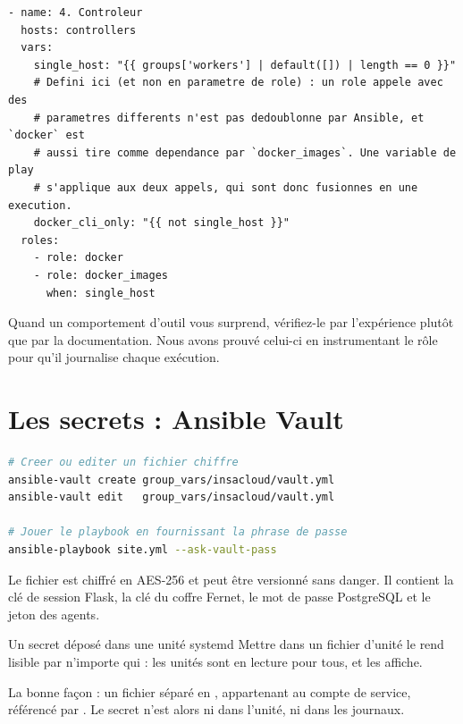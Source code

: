 \begin{lstlisting}[language=yamlplus,caption={La correction : une variable de play, pas un paramètre de rôle}]
- name: 4. Controleur
  hosts: controllers
  vars:
    single_host: "{{ groups['workers'] | default([]) | length == 0 }}"
    # Defini ici (et non en parametre de role) : un role appele avec des
    # parametres differents n'est pas dedoublonne par Ansible, et `docker` est
    # aussi tire comme dependance par `docker_images`. Une variable de play
    # s'applique aux deux appels, qui sont donc fusionnes en une execution.
    docker_cli_only: "{{ not single_host }}"
  roles:
    - role: docker
    - role: docker_images
      when: single_host
\end{lstlisting}

\begin{retenir}
Quand un comportement d'outil vous surprend, vérifiez-le par l'expérience
plutôt que par la documentation. Nous avons prouvé celui-ci en instrumentant
le rôle pour qu'il journalise chaque exécution.
\end{retenir}

\section{Les secrets : Ansible Vault}

\begin{lstlisting}[language=bash]
# Creer ou editer un fichier chiffre
ansible-vault create group_vars/insacloud/vault.yml
ansible-vault edit   group_vars/insacloud/vault.yml

# Jouer le playbook en fournissant la phrase de passe
ansible-playbook site.yml --ask-vault-pass
\end{lstlisting}

Le fichier est chiffré en AES-256 et peut être versionné sans danger. Il
contient la clé de session Flask, la clé du coffre Fernet, le mot de passe
PostgreSQL et le jeton des agents.

\begin{piege}{Un secret déposé dans une unité systemd}
Mettre  dans un fichier d'unité le
rend lisible par n'importe qui : les unités sont en lecture pour tous, et
 les affiche.

La bonne façon : un fichier séparé en , appartenant au compte de
service, référencé par . Le secret n'est alors ni dans
l'unité, ni dans les journaux.
\end{piege}

